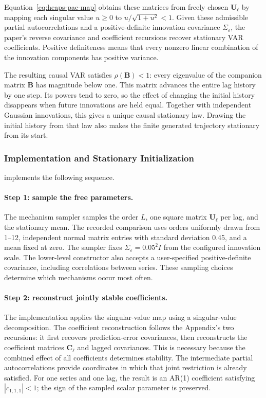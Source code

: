 Equation~\eqref{eq:heaps-pac-map} obtains these matrices from freely chosen
$\mathbf U_\ell$ by mapping each singular value $u\geq0$ to
$u/\sqrt{1+u^2}<1$. Given these admissible partial autocorrelations and a
positive-definite innovation covariance $\Sigma_\varepsilon$, the paper's
reverse covariance and coefficient recursions recover stationary VAR
coefficients. Positive definiteness means that every nonzero linear
combination of the innovation components has positive variance.

The resulting causal VAR satisfies $\rho(\mathbf B)<1$: every eigenvalue of
the companion matrix $\mathbf B$ has magnitude below one. This matrix
advances the entire lag history by one step. Its powers tend to zero, so
the effect of changing the initial history disappears when future
innovations are held equal. Together with independent Gaussian innovations,
this gives a unique causal stationary law. Drawing the initial history from
that law also makes the finite generated trajectory stationary from its start.

\subsubsection{Implementation and Stationary Initialization}
 implements the following sequence.

\paragraph{Step 1: sample the free parameters.}
The mechanism sampler samples the order $L$, one square
matrix $\mathbf U_\ell$ per lag, and the stationary mean. The recorded
comparison uses orders uniformly drawn from 1--12, independent normal
matrix entries with standard deviation 0.45, and a mean fixed at zero.
The sampler fixes $\Sigma_\varepsilon=0.05^2 I$ from the configured innovation
scale. The lower-level constructor also accepts a user-specified
positive-definite covariance, including correlations between series.
These sampling choices determine which mechanisms occur most often.

\paragraph{Step 2: reconstruct jointly stable coefficients.}
The implementation applies the singular-value map using a singular-value
decomposition. The coefficient reconstruction follows the Appendix's two
recursions: it first recovers prediction-error covariances, then reconstructs
the coefficient matrices $\mathbf C_\ell$ and lagged covariances. This is
necessary because the combined effect of all coefficients determines
stability. The intermediate partial autocorrelations provide coordinates
in which that joint restriction is already satisfied. For one series and
one lag, the result is an AR(1) coefficient satisfying $|c_{1,1,1}|<1$;
the sign of the sampled scalar parameter is preserved.

